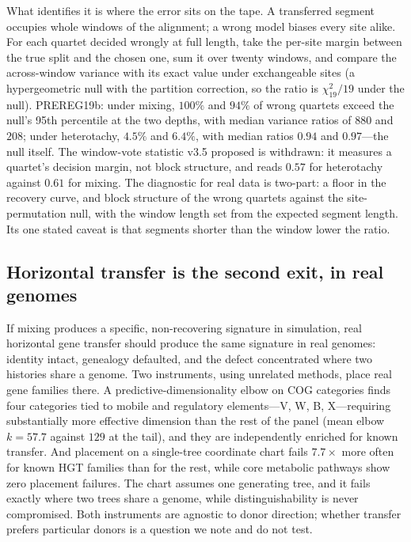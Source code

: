\documentclass[11pt]{article}
\begin{document}
What identifies it is where the error sits on the tape. A transferred segment occupies whole windows of the alignment; a wrong model biases every site alike. For each quartet decided wrongly at full length, take the per-site margin between the true split and the chosen one, sum it over twenty windows, and compare the across-window variance with its exact value under exchangeable sites (a hypergeometric null with the partition correction, so the ratio is $\chi^2_{19}/19$ under the null). PREREG19b: under mixing, $100\%$ and $94\%$ of wrong quartets exceed the null's 95th percentile at the two depths, with median variance ratios of $880$ and $208$; under heterotachy, $4.5\%$ and $6.4\%$, with median ratios $0.94$ and $0.97$---the null itself. The window-vote statistic v3.5 proposed is withdrawn: it measures a quartet's decision margin, not block structure, and reads $0.57$ for heterotachy against $0.61$ for mixing. The diagnostic for real data is two-part: a floor in the recovery curve, and block structure of the wrong quartets against the site-permutation null, with the window length set from the expected segment length. Its one stated caveat is that segments shorter than the window lower the ratio.

\subsection{Horizontal transfer is the second exit, in real genomes}

If mixing produces a specific, non-recovering signature in simulation, real horizontal gene transfer should produce the same signature in real genomes: identity intact, genealogy defaulted, and the defect concentrated where two histories share a genome. Two instruments, using unrelated methods, place real gene families there. A predictive-dimensionality elbow on COG categories finds four categories tied to mobile and regulatory elements---V, W, B, X---requiring substantially more effective dimension than the rest of the panel (mean elbow $k=57.7$ against $129$ at the tail), and they are independently enriched for known transfer. And placement on a single-tree coordinate chart fails $7.7\times$ more often for known HGT families than for the rest, while core metabolic pathways show zero placement failures. The chart assumes one generating tree, and it fails exactly where two trees share a genome, while distinguishability is never compromised. Both instruments are agnostic to donor direction; whether transfer prefers particular donors is a question we note and do not test.
\end{document}
